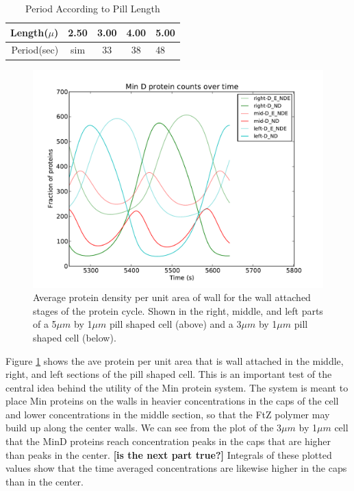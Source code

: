 \documentclass[letterpaper,twocolumn,amsmath,amssymb,pre]{revtex4-1}
\newcommand{\red}[1]{{\bf \color{red} #1}}
\newcommand{\fixme}[1]{\red{[#1]}}
\begin{document}
\begin{table}
  \begin{tabular}{|r|c|c|c|l|}
    \hline
    Length($\mu$) & 2.50 & 3.00 & 4.00 & 5.00\\
    \hline
    Period(sec) & sim & 33 & 38 & 48 \\ \cline{2-2}
    \hline
  \end{tabular}
  \caption{Period According to Pill Length}
\end{table}

\begin{figure}
  \includegraphics[width=\columnwidth]{../data/shape-p/plots/ave-plot_D--p-200-50-0-0-1500}
  \caption{Average protein density per unit area of wall for the wall
    attached stages of the protein cycle.  Shown in the right, middle,
    and left parts of a 5$\mu m$ by 1$\mu m$ pill shaped cell (above)
    and a 3$\mu m$ by 1$\mu m$ pill shaped cell (below).}
  \label{ave-per-area-plot-pill}
\end{figure}

Figure \ref{ave-per-area-plot-pill} shows the ave protein per unit
area that is wall attached in the middle, right, and left sections of
the pill shaped cell.  This is an important test of the central idea
behind the utility of the Min protein system.  The system is meant to
place Min proteins on the walls in heavier concentrations in the caps
of the cell and lower concentrations in the middle section, so that
the FtZ polymer may build up along the center walls.  We can see from
the plot of the 3$\mu m$ by 1$\mu m$ cell that the MinD proteins reach
concentration peaks in the caps that are higher than peaks in the
center.  \fixme{is the next part true?} Integrals of these plotted values show that the time averaged
concentrations are likewise higher in the caps than in the center.
\end{document}
